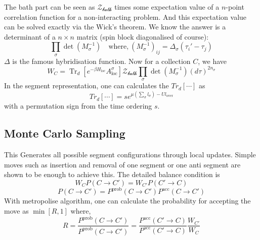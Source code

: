 \documentclass[a4paper]{article}
\DeclareMathOperator{\Tr}{Tr}
\begin{document}
The bath part can be seen as $\mathcal{Z_{\text{bath}}}$ times some expectation
value of a $n$-point correlation function for a non-interacting problem. And
this expectation value can be solved exactly via the Wick's theorem. We know
the answer is a determinant of a $n \times n$ matrix (spin block diagonalised
of course):
\begin{equation}
    \prod_{\sigma} \det \left(M_{\sigma}^{-1}\right)
    \quad \text{where,} \ 
    \left(M_{\sigma}^{-1}\right)_{ij} = \Delta_{\sigma} (\tau_{i}' - \tau_{j})
\end{equation}
$\Delta$ is the famous hybridisation function. Now for a collection $C$, we have
\begin{equation}
    W_{C} = 
        \Tr_{d} \left[ e^{-\beta H_{\text{loc}}} A^{\sigma}_{\text{loc}} \right]
        \mathcal{Z_{\text{bath}}} \prod_{\sigma}\det\left(M_{\sigma}^{-1}\right)
        (d\tau)^{2n_\sigma}
\end{equation}
In the segment representation, one can calculates the $Tr_{d}[\cdots]$ as
\begin{equation}
    Tr_{d}[\cdots] = s e^{\mu(\sum_{\sigma}l_{\sigma}) - U l_{\text{over}}}
\end{equation}
with a permutation sign from the time ordering $s$.

\subsection{Monte Carlo Sampling} %
\label{sub:Monte Carlo Sampling}
This Generates all possible segment configurations through local updates. Simple
moves such as insertion and removal of one segment or one anti segment are shown
to be enough to achieve this.
The detailed balance condition is
\begin{equation}
    W_{C} P(C \to C')  = W_{C'} P(C' \to C)
\end{equation}
\begin{equation}
    P(C \to C') = P^{\text{prob}}(C \to C') P^{\text{acc}}(C \to C')
\end{equation}
With metropolise algorithm, one can calculate the probability for accepting the
move as $\min [ R, 1 ]$ where,
\begin{equation}
    R = \frac{P^{\text{prob}}(C \to C')}{P^{\text{prob}}(C \to C')}
      = \frac{P^{\text{acc}}(C' \to C)}{P^{\text{acc}}(C' \to C)}
        \frac{W_{C'}}{W_{C}} 
\end{equation}
\end{document}
